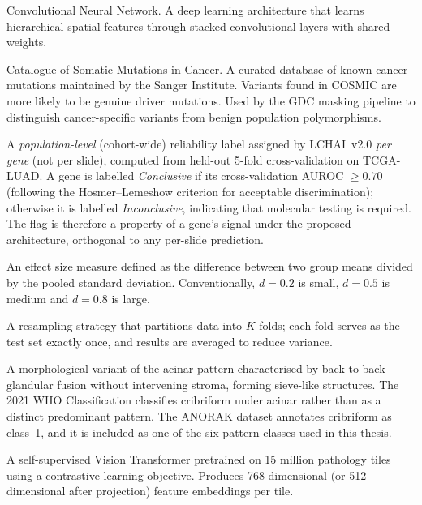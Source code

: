 \begin{description}[style=nextline,leftmargin=4cm]
\item[CNN] Convolutional Neural Network.  A deep learning architecture that learns hierarchical spatial features through stacked convolutional layers with shared weights.


\item[COSMIC] Catalogue of Somatic Mutations in Cancer.  A curated database of known cancer mutations maintained by the Sanger Institute.  Variants found in COSMIC are more likely to be genuine driver mutations.  Used by the GDC masking pipeline to distinguish cancer-specific variants from benign population polymorphisms.


\item[Conclusive / Inconclusive] A \emph{population-level} (cohort-wide) reliability label assigned by LCHAI~v2.0 \emph{per gene} (not per slide), computed from held-out 5-fold cross-validation on TCGA-LUAD.  A gene is labelled \emph{Conclusive} if its cross-validation AUROC $\geq 0.70$ (following the Hosmer--Lemeshow criterion for acceptable discrimination); otherwise it is labelled \emph{Inconclusive}, indicating that molecular testing is required.  The flag is therefore a property of a gene's signal under the proposed architecture, orthogonal to any per-slide prediction.

\item[Cohen's $d$] An effect size measure defined as the difference between two group means divided by the pooled standard deviation.  Conventionally, $d = 0.2$ is small, $d = 0.5$ is medium and $d = 0.8$ is large.


\item[Cross-validation (K-fold)] A resampling strategy that partitions data into $K$ folds; each fold serves as the test set exactly once, and results are averaged to reduce variance.


\item[Cribriform pattern] A morphological variant of the acinar pattern characterised by back-to-back glandular fusion without intervening stroma, forming sieve-like structures.  The 2021 WHO Classification classifies cribriform under acinar rather than as a distinct predominant pattern.  The ANORAK dataset annotates cribriform as class~1, and it is included as one of the six pattern classes used in this thesis.


\item[CTransPath] A self-supervised Vision Transformer pretrained on 15 million pathology tiles using a contrastive learning objective.  Produces 768-dimensional (or 512-dimensional after projection) feature embeddings per tile.



\end{description}
